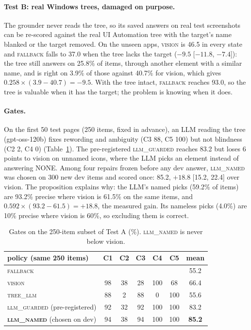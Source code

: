 \documentclass[11pt]{article}
\newcommand{\vis}{\textsc{vision}}
\newcommand{\fb}{\textsc{fallback}}
\begin{document}
\paragraph{Test B: real Windows trees, damaged on purpose.} The grounder never reads the tree, so its saved
answers on real test screenshots can be re-scored against the real UI Automation tree with the target's name
blanked or the target removed. On the unseen apps, \vis{} is 46.5 in every state and \fb{} falls to 37.0
when the tree lacks the target ($-9.5$ [$-11.8$, $-7.4$]): the tree still answers on 25.8\% of items,
through another element with a similar name, and is right on 3.9\% of those against 40.7\% for vision,
which gives $0.258 \times (3.9 - 40.7) = -9.5$. With the tree intact, \fb{} reaches 93.0, so the tree is
valuable when it has the target; the problem is knowing when it does.

\paragraph{Gates.} On the first 50 test pages (250 items, fixed in advance), an LLM reading the tree
(gpt-oss-120b) fixes rewording and ambiguity (C3 88, C5 100) but not blindness (C2 2, C4 0)
(Table~\ref{tab:gates}). The pre-registered \textsc{llm\_guarded} reaches 83.2 but loses 6 points to vision
on unnamed icons, where the LLM picks an element instead of answering NONE. Among four repairs frozen before
any dev answer, \textsc{llm\_named} was chosen on 300 new dev items and scored once: 85.2, $+18.8$
[15.2, 22.4] over vision. The proposition explains why: the LLM's named picks (59.2\% of items) are 93.2\%
precise where vision is 61.5\% on the same items, and $0.592 \times (93.2 - 61.5) = +18.8$, the measured
gain. Its nameless picks (4.0\%) are 10\% precise where vision is 60\%, so excluding them is correct.

\begin{table}[t]
\centering\small
\begin{tabular}{lcccccc}
\toprule
policy (same 250 items) & C1 & C2 & C3 & C4 & C5 & mean \\
\midrule
\fb & & & & & & 55.2 \\
\vis & 98 & 38 & 28 & 100 & 68 & 66.4 \\
\textsc{tree\_llm} & 88 & 2 & 88 & 0 & 100 & 55.6 \\
\textsc{llm\_guarded} (pre-registered) & 92 & 32 & 92 & 100 & 100 & 83.2 \\
\textbf{\textsc{llm\_named}} (chosen on dev) & 94 & 38 & 94 & 100 & 100 & \textbf{85.2} \\
\bottomrule
\end{tabular}
\caption{Gates on the 250-item subset of Test A (\%). \textsc{llm\_named} is never below vision.}
\label{tab:gates}
\end{table}
\end{document}

